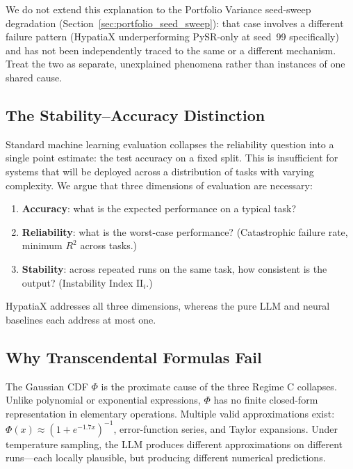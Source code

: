 \documentclass[twoside,11pt]{article}
\newcommand{\Rsq}{R^{2}}
\newcommand{\II}{\mathrm{II}}
\begin{document}
We do not extend this explanation to the Portfolio Variance seed-sweep
degradation (Section~\ref{sec:portfolio_seed_sweep}): that case involves a
different failure pattern (HypatiaX underperforming PySR-only at seed~99
specifically) and has not been independently traced to the same or a
different mechanism. Treat the two as separate, unexplained phenomena
rather than instances of one shared cause.

\subsection{The Stability--Accuracy Distinction}\label{subsec:the-stabilityaccuracy-distinction}
\label{sec:disc_stability}

Standard machine learning evaluation collapses the reliability question into a
single point estimate: the test accuracy on a fixed split.  This is insufficient
for systems that will be deployed across a distribution of tasks with varying
complexity.  We argue that three dimensions of evaluation are necessary:
\begin{enumerate}[leftmargin=2em,label=(\roman*)]
  \item \textbf{Accuracy}: what is the expected performance on a typical task?
  \item \textbf{Reliability}: what is the worst-case performance?
    (Catastrophic failure rate, minimum $\Rsq$ across tasks.)
  \item \textbf{Stability}: across repeated runs on the same task, how consistent
    is the output?  (Instability Index $\II_i$.)
\end{enumerate}

HypatiaX addresses all three dimensions, whereas the pure LLM and neural baselines
each address at most one.

\subsection{Why Transcendental Formulas Fail}\label{subsec:why-transcendental-formulas-fail}
\label{sec:disc_transcendental}

The Gaussian CDF $\Phi$ is the proximate cause of the three Regime C collapses.
Unlike polynomial or exponential expressions, $\Phi$ has no finite closed-form
representation in elementary operations.  Multiple valid approximations exist:
$\Phi(x) \approx (1 + e^{-1.7x})^{-1}$, error-function series, and Taylor
expansions.  Under temperature sampling, the LLM produces different approximations
on different runs---each locally plausible, but producing different numerical
predictions.
\end{document}
